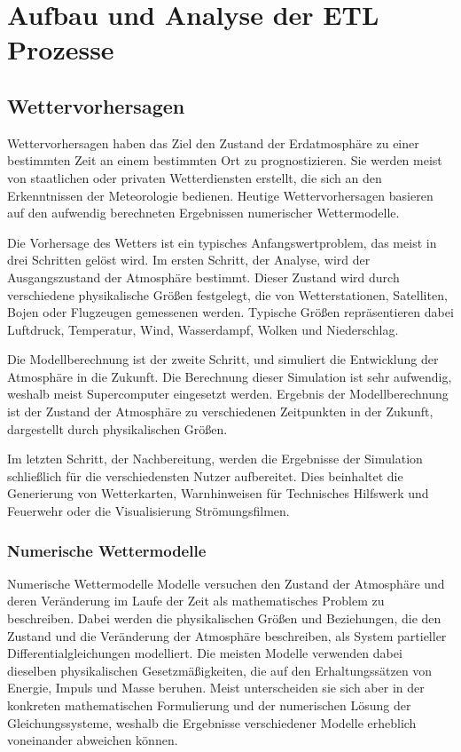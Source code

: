 
\chapter{Aufbau und Analyse der ETL Prozesse}

\section{Wettervorhersagen}

Wettervorhersagen haben das Ziel den Zustand der Erdatmosphäre zu
einer bestimmten Zeit an einem bestimmten Ort zu prognostizieren. Sie
werden meist von staatlichen oder privaten Wetterdiensten erstellt,
die sich an den Erkenntnissen der Meteorologie bedienen. Heutige
Wettervorhersagen basieren auf den aufwendig berechneten Ergebnissen
numerischer Wettermodelle.

Die Vorhersage des Wetters ist ein typisches Anfangswertproblem, das
meist in drei Schritten gelöst wird. Im ersten Schritt, der Analyse,
wird der Ausgangszustand der Atmosphäre bestimmt. Dieser Zustand wird
durch verschiedene physikalische Größen festgelegt, die von
Wetterstationen, Satelliten, Bojen oder Flugzeugen gemessenen
werden. Typische Größen repräsentieren dabei Luftdruck, Temperatur,
Wind, Wasserdampf, Wolken und Niederschlag.

Die Modellberechnung ist der zweite Schritt, und simuliert die
Entwicklung der Atmosphäre in die Zukunft. Die Berechnung dieser
Simulation ist sehr aufwendig, weshalb meist Supercomputer eingesetzt
werden. Ergebnis der Modellberechnung ist der Zustand der Atmosphäre
zu verschiedenen Zeitpunkten in der Zukunft, dargestellt durch
physikalischen Größen.

Im letzten Schritt, der Nachbereitung, werden die Ergebnisse der
Simulation schließlich für die verschiedensten Nutzer
aufbereitet. Dies beinhaltet die Generierung von Wetterkarten,
Warnhinweisen für Technisches Hilfswerk und Feuerwehr oder die
Visualisierung Strömungsfilmen.

\subsection{Numerische Wettermodelle}

Numerische Wettermodelle Modelle versuchen den Zustand der Atmosphäre
und deren Veränderung im Laufe der Zeit als mathematisches Problem zu
beschreiben. Dabei werden die physikalischen Größen und Beziehungen,
die den Zustand und die Veränderung der Atmosphäre beschreiben, als
System partieller Differentialgleichungen modelliert. Die meisten
Modelle verwenden dabei dieselben physikalischen Gesetzmäßigkeiten,
die auf den Erhaltungssätzen von Energie, Impuls und Masse
beruhen. Meist unterscheiden sie sich aber in der konkreten
mathematischen Formulierung und der numerischen Lösung der
Gleichungssysteme, weshalb die Ergebnisse verschiedener Modelle
erheblich voneinander abweichen können.

